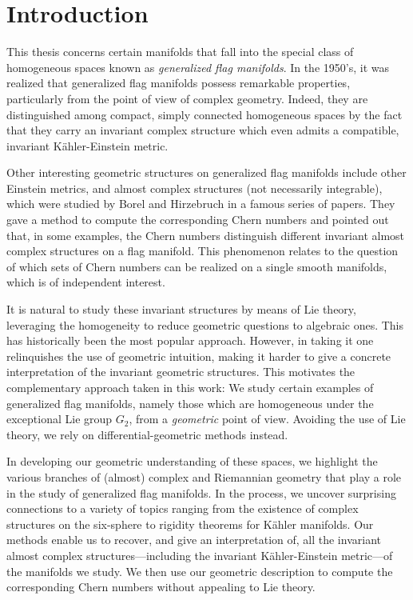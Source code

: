 \chapter{Introduction}

This thesis concerns certain manifolds that fall into the special class of homogeneous spaces known as \emph{generalized flag manifolds}. In the 1950's, it was realized that generalized flag manifolds possess remarkable properties, particularly from the point of view of complex geometry. Indeed, they are distinguished among compact, simply connected homogeneous spaces by the fact that they carry an invariant complex structure which even admits a compatible, invariant K\"ahler-Einstein metric. 

Other interesting geometric structures on generalized flag manifolds include other Einstein metrics, and almost complex structures (not necessarily integrable), which were studied by Borel and Hirzebruch in a famous series of papers. They gave a method to compute the corresponding Chern numbers and pointed out that, in some examples, the Chern numbers distinguish different invariant almost complex structures on a flag manifold. This phenomenon relates to the question of which sets of Chern numbers can be realized on a single smooth manifolds, which is of independent interest.

It is natural to study these invariant structures by means of Lie theory, leveraging the homogeneity to reduce geometric questions to algebraic ones. This has historically been the most popular approach. However, in taking it one relinquishes the use of geometric intuition, making it harder to give a concrete interpretation of the invariant geometric structures. This motivates the complementary approach taken in this work: We study certain examples of generalized flag manifolds, namely those which are homogeneous under the exceptional Lie group $G_2$, from a \emph{geometric} point of view. Avoiding the use of Lie theory, we rely on differential-geometric methods instead. 

In developing our geometric understanding of these spaces, we highlight the various branches of (almost) complex and Riemannian geometry that play a role in the study of generalized flag manifolds. In the process, we uncover surprising connections to a variety of topics ranging from the existence of complex structures on the six-sphere to rigidity theorems for K\"ahler manifolds. Our methods enable us to recover, and give an interpretation of, all the invariant almost complex structures---including the invariant K\"ahler-Einstein metric---of the manifolds we study. We then use our geometric description to compute the corresponding Chern numbers without appealing to Lie theory.

